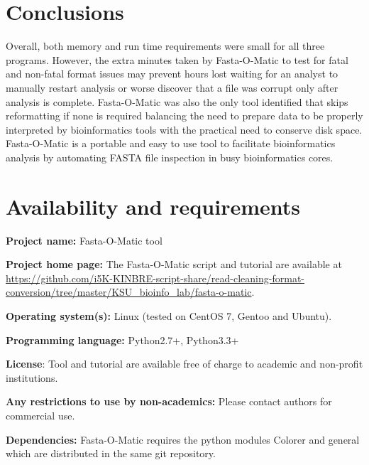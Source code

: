 \documentclass{bmcart}
\begin{document}
\section{Conclusions}
Overall, both memory and run time requirements were small for all three programs. However, the extra minutes taken by Fasta-O-Matic to test for fatal and non-fatal format issues may prevent hours lost waiting for an analyst to manually restart analysis or worse discover that a file was corrupt only after analysis is complete. Fasta-O-Matic was also the only tool identified that skips reformatting if none is required balancing the need to prepare data to be properly interpreted by bioinformatics tools with the practical need to conserve disk space. Fasta-O-Matic is a portable and easy to use tool to facilitate bioinformatics analysis by automating FASTA file inspection in busy bioinformatics cores.

\section{Availability and requirements}
\textbf{Project name:} Fasta-O-Matic tool

\textbf{Project home page:} The Fasta-O-Matic script and tutorial are available at \url{https://github.com/i5K-KINBRE-script-share/read-cleaning-format-conversion/tree/master/KSU\_bioinfo\_lab/fasta-o-matic}. 

\textbf{Operating system(s):} Linux (tested on CentOS 7, Gentoo and Ubuntu).

\textbf{Programming language:} Python2.7+, Python3.3+

\textbf{License}: Tool and tutorial are available free of charge to academic and non-profit institutions.

\textbf{Any restrictions to use by non-academics:} Please contact authors for commercial use.

\textbf{Dependencies:} Fasta-O-Matic requires the python modules Colorer and general which are distributed in the same git repository.

\end{document}
